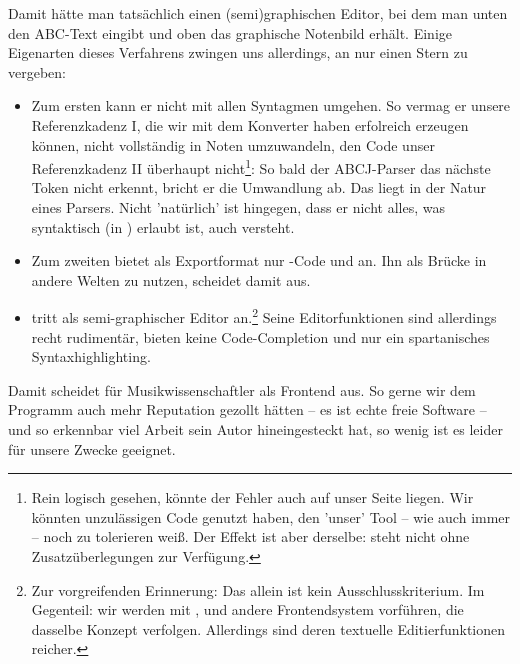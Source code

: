 Damit hätte man tatsächlich einen (semi)graphischen Editor, bei dem man unten
den ABC-Text eingibt und oben das graphische Notenbild erhält. Einige Eigenarten
dieses Verfahrens zwingen uns allerdings, an  nur einen Stern zu
vergeben:

\begin{itemize}
  \item Zum ersten kann er nicht mit allen Syntagmen umgehen. So vermag er
  unsere Referenzkadenz I, die wir mit dem Konverter  haben
  erfolreich erzeugen können, nicht vollständig in Noten umzuwandeln, den Code
  unser Referenzkadenz II überhaupt nicht\footnote{Rein logisch gesehen, könnte
  der Fehler auch auf unser Seite liegen. Wir könnten unzulässigen Code genutzt
  haben, den 'unser' Tool  -- wie auch immer -- noch zu tolerieren
  weiß. Der Effekt ist aber derselbe:  steht nicht ohne
  Zusatzüberlegungen zur Verfügung.}: So bald der ABCJ-Parser das nächste Token
  nicht erkennt, bricht er die Umwandlung ab. Das liegt in der Natur eines
  Parsers. Nicht 'natürlich' ist hingegen, dass er nicht alles, was syntaktisch
  (in ) erlaubt ist, auch versteht.
  \item Zum zweiten bietet  als Exportformat nur -Code und
   an. Ihn als Brücke in andere Welten zu nutzen, scheidet damit aus.
  \item {} tritt als semi-graphischer Editor an.\footnote{Zur
  vorgreifenden Erinnerung: Das allein ist kein Ausschlusskriterium. Im
  Gegenteil: wir werden mit ,  und 
  andere Frontendsystem vorführen, die dasselbe Konzept verfolgen. Allerdings
  sind deren textuelle Editierfunktionen reicher.} Seine Editorfunktionen sind
  allerdings recht rudimentär, bieten keine Code-Completion und nur ein
  spartanisches Syntaxhighlighting.
\end{itemize}

Damit scheidet  für Musikwissenschaftler als Frontend aus. So gerne
wir dem Programm auch mehr Reputation gezollt hätten -- es ist echte freie
Software -- und so erkennbar viel Arbeit sein Autor hineingesteckt hat, so wenig
ist es leider für unsere Zwecke geeignet.


%
